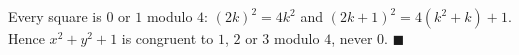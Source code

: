Every square is $0$ or $1$ modulo $4$: $(2k)^2=4k^2$ and $(2k+1)^2=4(k^2+k)+1$. Hence $x^2+y^2+1$ is congruent to $1$, $2$ or $3$ modulo $4$, never $0$. $\blacksquare$
